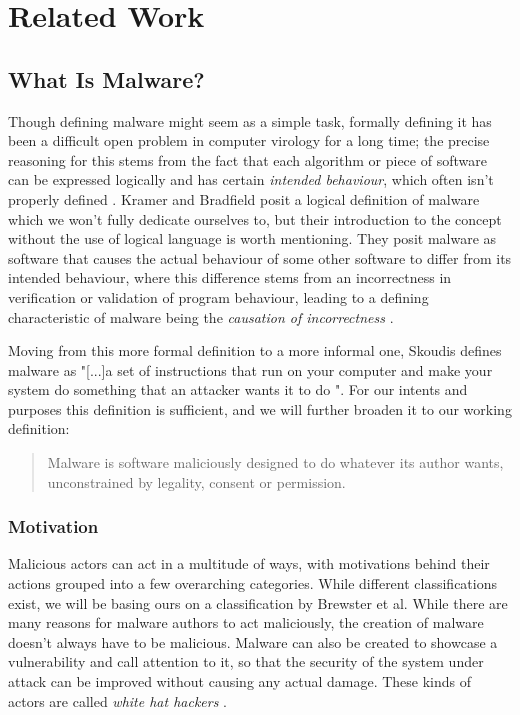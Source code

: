 \chapter{Related Work}
\section{What Is Malware?}
Though defining malware might seem as a simple task, formally defining it has been a difficult open problem in 
computer virology for a long time; the precise reasoning for this stems from the fact that each algorithm or
piece of software can be expressed logically and has certain \emph{intended behaviour}, which often isn't
properly defined \cite{malware-definition}. Kramer and Bradfield posit a logical definition of malware which
we won't fully dedicate ourselves to, but their introduction to the concept without the use of logical language
is worth mentioning. They posit malware as software that causes the actual behaviour of some other software
to differ from its intended behaviour, where this difference stems from an incorrectness in verification or
validation of program behaviour, leading to a defining characteristic of malware being the \emph{causation of incorrectness}
\cite{malware-definition}. 

Moving from this more formal definition to a more informal one, Skoudis defines malware as "[...]a set of instructions that 
run on your computer and make your system do something that an attacker wants it to do \cite{skoudis-book}". For our
intents and purposes this definition is sufficient, and we will further broaden it to our working definition:
\begin{quote}
  Malware is software maliciously designed to do whatever its author wants, unconstrained by legality, consent or
  permission.
\end{quote}

\subsection{Motivation}
Malicious actors can act in a multitude of ways, with motivations behind their actions grouped into a few overarching
categories. While different classifications exist, we will be basing ours on a classification by Brewster et al.
While there are many reasons for malware authors to act maliciously, the creation of malware doesn't always have
to be malicious. Malware can also be created to showcase a vulnerability and call attention to it, so that the 
security of the system  under attack can be improved without causing any actual damage. These kinds of actors are 
called \emph{white hat hackers} \cite{white-hat-hacking-definition}.


